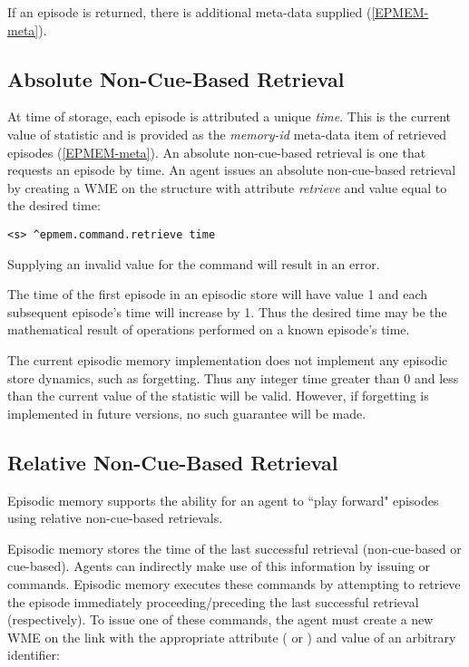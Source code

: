 If an episode is returned, there is additional meta-data supplied (\ref{EPMEM-meta}).

\subsection{Absolute Non-Cue-Based Retrieval}
At time of storage, each episode is attributed a unique \emph{time}.
This is the current value of  statistic and is provided as the \emph{memory-id} meta-data item of retrieved episodes (\ref{EPMEM-meta}).
An absolute non-cue-based retrieval is one that requests an episode by time.
An agent issues an absolute non-cue-based retrieval by creating a WME on the  structure with attribute \emph{retrieve} and value equal to the desired time:

\begin{verbatim}
<s> ^epmem.command.retrieve time
\end{verbatim}

Supplying an invalid value for the  command will result in an error.

The time of the first episode in an episodic store will have value 1 and each subsequent episode's time will increase by 1.
Thus the desired time may be the mathematical result of operations performed on a known episode's time.

The current episodic memory implementation does not implement any episodic store dynamics, such as forgetting.
Thus any integer time greater than 0 and less than the current value of the  statistic will be valid.
However, if forgetting is implemented in future versions, no such guarantee will be made.

\subsection{Relative Non-Cue-Based Retrieval}
Episodic memory supports the ability for an agent to ``play forward" episodes using relative non-cue-based retrievals.

Episodic memory stores the time of the last successful retrieval (non-cue-based or cue-based).
Agents can indirectly make use of this information by issuing  or  commands.
Episodic memory executes these commands by attempting to retrieve the episode immediately proceeding/preceding the last successful retrieval (respectively).
To issue one of these commands, the agent must create a new WME on the  link with the appropriate attribute ( or ) and value of an arbitrary identifier:

